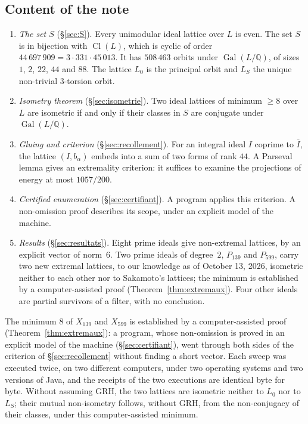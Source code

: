 \documentclass[11pt,a4paper]{amsart}
\theoremstyle{plain}
\theoremstyle{definition}
\numberwithin{equation}{section}
\newcommand{\Q}{\mathbb{Q}}
\DeclareMathOperator{\Cl}{Cl}
\DeclareMathOperator{\Gal}{Gal}
\newcommand{\Lz}{L_{0}}
\newcommand{\LS}{L_{S}}
\begin{document}
\subsection{Content of the note}
\begin{enumerate}[label=\textup{(\arabic*)}]
\item \emph{The set $S$} (\S\ref{sec:S}). Every unimodular ideal lattice over $L$ is even. The set $S$ is in bijection with $\Cl(L)$, which is cyclic of order $44\,697\,909=3\cdot331\cdot45\,013$. It has $508\,463$ orbits under $\Gal(L/\Q)$, of sizes $1$, $2$, $22$, $44$ and $88$. The lattice $\Lz$ is the principal orbit and $\LS$ the unique non-trivial $3$-torsion orbit.
\item \emph{Isometry theorem} (\S\ref{sec:isometrie}). Two ideal lattices of minimum $\ge8$ over $L$ are isometric if and only if their classes in $S$ are conjugate under $\Gal(L/\Q)$.
\item \emph{Gluing and criterion} (\S\ref{sec:recollement}). For an integral ideal $I$ coprime to $\bar I$, the lattice $(I,b_\alpha)$ embeds into a sum of two forms of rank $44$. A Parseval lemma gives an extremality criterion: it suffices to examine the projections of energy at most $1057/200$.
\item \emph{Certified enumeration} (\S\ref{sec:certifiant}). A program applies this criterion. A non-omission proof describes its scope, under an explicit model of the machine.
\item \emph{Results} (\S\ref{sec:resultats}). Eight prime ideals give non-extremal lattices, by an explicit vector of norm~$6$. Two prime ideals of degree~$2$, $P_{139}$ and $P_{599}$, carry two new extremal lattices, to our knowledge as of October 13, 2026, isometric neither to each other nor to Sakamoto's lattices; the minimum is established by a computer-assisted proof (Theorem~\ref{thm:extremaux}). Four other ideals are partial survivors of a filter, with no conclusion.
\end{enumerate}

The minimum $8$ of $X_{139}$ and $X_{599}$ is established by a computer-assisted proof (Theorem~\ref{thm:extremaux}): a program, whose non-omission is proved in an explicit model of the machine (\S\ref{sec:certifiant}), went through both sides of the criterion of \S\ref{sec:recollement} without finding a short vector. Each sweep was executed twice, on two different computers, under two operating systems and two versions of Java, and the receipts of the two executions are identical byte for byte. Without assuming GRH, the two lattices are isometric neither to $\Lz$ nor to $\LS$; their mutual non-isometry follows, without GRH, from the non-conjugacy of their classes, under this computer-assisted minimum.
\end{document}
